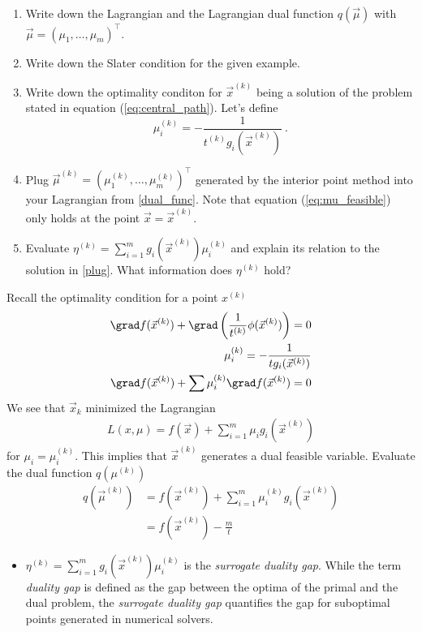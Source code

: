 \begin{exercise}[subtitle={Paper}]
\begin{enumerate}[label=\emph{\alph*)}]
\item Write down the Lagrangian and the Lagrangian dual function $q(\vec \mu)$ with $\vec \mu = (\mu_1,\dots, \mu_m)^\top $. \label{dual_func}
\item Write down the Slater condition for the given example.
\item Write down the optimality conditon for $\vec{x}^{(k)}$ being a solution of the problem stated in equation (\ref{eq:central_path}). Let's define \begin{equation}
\mu^{(k)}_i = -\frac{1}{t^{(k)} g_i(\vec x^{(k)})}~.
\label{eq:mu_feasible}
\end{equation}
\item Plug $\vec \mu^{(k)} = (\mu_1^{(k)},\dots, \mu_m^{(k)})^\top $ generated by the interior point method into your Lagrangian from \ref{dual_func}. Note that equation (\ref{eq:mu_feasible}) only holds at the point $\vec x = \vec{x}^{(k)}$. \label{plug}
\item Evaluate $\eta^{(k)} = \sum_{i = 1}^m g_i(\vec x^{(k)})\mu_i^{(k)}$ and explain its relation to the solution in \ref{plug}. What information does $\eta^{(k)}$ hold? \label{gap}
\end{enumerate}
\end{exercise}

\begin{solution}[print=false]
Recall the optimality condition for a point $x^{(k)}$
\begin{align}
\grad f(\vec x^{(k)}) + \grad \left(\frac{1}{t^{(k)}}\phi(\vec x^{(k)})\right) = 0\\
\mu^{(k)}_i = -\frac{1}{t g_i(\vec x^{(k)})}\\
\grad f(\vec x^{(k)}) + \sum \mu^{(k)}_i \grad f(\vec x^{(k)}) = 0\\
\end{align}
We see that $\vec x_k$ minimized the Lagrangian
\begin{align*}
L(x,\mu) = f(\vec x) + \sum_{i = 1}^{m} \mu_i g_i(\vec x^{(k)})
\end{align*}
for $\mu_i = \mu_i^{(k)}$. This implies that $\vec x^{(k)}$ generates a dual feasible variable.
Evaluate the dual function $q(\mu^{(k)})$
\begin{align*}
q(\vec \mu^{(k)}) &= f(\vec x^{(k)}) + \sum_{i = 1}^{m} \mu^{(k)}_i g_i(\vec x^{(k)})\\
& = f(\vec x^{(k)}) - \frac{m}{t}
\end{align*}
\begin{itemize}
\item $\eta^{(k)} = \sum_{i = 1}^m g_i(\vec x^{(k)})\mu_i^{(k)}$ is the \emph{surrogate duality gap}. While the term \emph{duality gap} is defined as the gap between the optima of the primal and the dual problem, the \emph{surrogate duality gap} quantifies the gap for suboptimal points generated in numerical solvers.
\end{itemize}
\end{solution}



